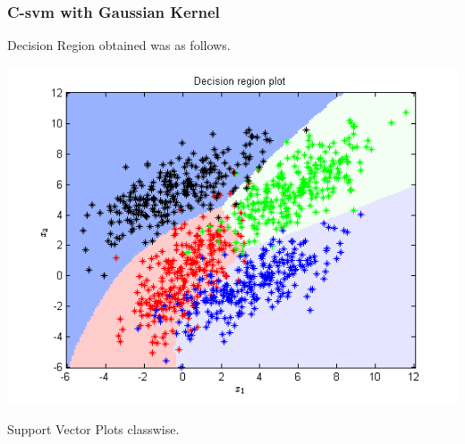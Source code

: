 \documentclass{article}
\begin{document}
\subsubsection{C-svm with Gaussian Kernel}
Decision Region obtained was as follows.
\begin{center}
\includegraphics[scale=0.8]{Classification/1c/c_g/dec}
\end{center}
Support Vector Plots classwise.
\end{document}
